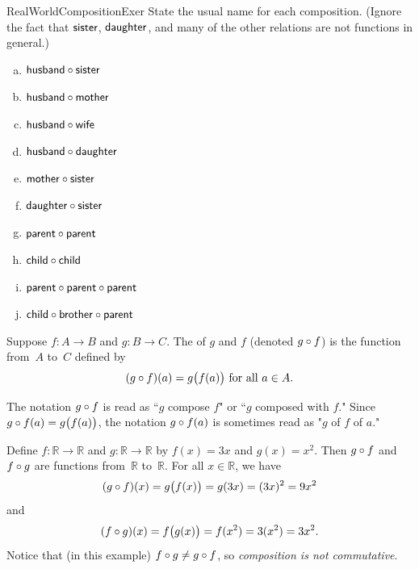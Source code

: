 \begin{exercise}{RealWorldCompositionExer}
State the usual name for each composition. 
 (Ignore the fact that $\sf{sister}$, $\sf{daughter}$, and many of the other relations are not functions in general.)
\begin{enumerate}[(a)]
\item \label{RealWorldCompositionExer-HusbandOfSister}
$\sf{husband} \circ \sf{sister}$
\item \label{RealWorldCompositionExer-HusbandOfMother}
$\sf{husband} \circ \sf{mother}$
\item \label{RealWorldCompositionExer-HusbandOfWife}
$\sf{husband} \circ \sf{wife}$
\item \label{RealWorldCompositionExer-HusbandOfDaughter}
$\sf{husband} \circ \sf{daughter}$
\item \label{RealWorldCompositionExer-MotherOfSister}
$\sf{mother} \circ \sf{sister}$
\item \label{RealWorldCompositionExer-DaughterOfSister}
$\sf{daughter} \circ \sf{sister}$
\item \label{RealWorldCompositionExer-ParentOfParent}
$\sf{parent} \circ \sf{parent}$
\item \label{RealWorldCompositionExer-ChildOfChild}
$\sf{child} \circ \sf{child}$
\item \label{RealWorldCompositionExer-ParentOfParentOfParent}
$\sf{parent} \circ \sf{parent} \circ \sf{parent}$
\item \label{RealWorldCompositionExer-ChildOfBrotherOfParent}
$\sf{child} \circ \sf{brother} \circ \sf{parent}$
\end{enumerate}
\end{exercise}

\begin{defn}\label{defn:composition}
Suppose $f \colon A \to B$ and $g \colon B \to C$. The  of $g$ and $f$ (denoted $g \circ f$) is the function from~$A$ to~$C$ defined by
$$ \mbox{$(g \circ f)(a) = g \bigl( f(a) \bigr)$ for all $a \in A$.} $$
\end{defn}
 
The notation $g \circ f$ is read as ``$g$ compose $f$" or ``$g$ composed with $f$." Since $g \circ f(a) = g \bigl( f(a) \bigr)$, the notation $g \circ f(a)$ is sometimes read as "$g$ of $f$ of $a$."

\begin{example}{}
Define $f \colon \mathbb{R} \to \mathbb{R}$ and $g \colon \mathbb{R} \to \mathbb{R}$ by
$f(x) = 3x$ and $g(x) = x^2$. Then $g \circ f$ and $f \circ g$ are functions from~$\mathbb{R}$ to~$\mathbb{R}$. For all $x \in \mathbb{R}$, we have
$$(g \circ f)(x) = g \bigl( f(x) \bigr) = g(3x) =(3x)^2 =  9x^2 $$
and
$$(f \circ g)(x) = f \bigl( g(x) \bigr) = f(x^2) = 3(x^2) = 3x^2 .$$
Notice that (in this example) $f \circ g \neq g \circ f$, so \emph{composition is not commutative}.
\end{example}

